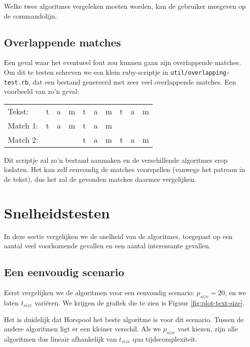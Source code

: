 \documentclass[a4paper,11pt]{article}
\begin{document}
Welke twee algoritmes vergeleken moeten worden, kan de gebruiker meegeven op de
commandolijn.

\subsection{Overlappende matches}

Een geval waar het eventueel fout zou kunnen gaan zijn overlappende matches. Om
dit te testen schreven we een klein ruby-scriptje in
\verb#util/overlapping-test.rb#, dat een bestand genereerd met zeer veel
overlappende matches. Een voorbeeld van zo'n geval:

\begin{center}
\begin{tabular}{llllllllll}
Tekst:   & t & a & m & t & a & m & t & a & m \\
Match 1: & t & a & m & t & a & m &   &   &   \\
Match 2: &   &   &   & t & a & m & t & a & m \\
\end{tabular}
\end{center}

Dit scriptje zal zo'n bestand aanmaken en de verschillende algoritmes erop
loslaten. Het kan zelf eenvoudig de matches voorspellen (vanwege het patroon in
de tekst), dus het zal de gevonden matches daarmee vergelijken.

\section{Snelheidstesten}

In deze sectie vergelijken we de snelheid van de algoritmes, toegepast op een
aantal veel voorkomende gevallen en een aantal interessante gevallen.

\subsection{Een eenvoudig scenario}

Eerst vergelijken we de algoritmen voor een eenvoudig scenario: $p_{size} = 20$,
en we laten $t_{size}$ vari\"eren. We krijgen de grafiek die te zien is Figuur
\ref{fig:plot-text-size}.

Het is duidelijk dat Horspool het beste algoritme is voor dit scenario.
Tussen de andere algoritmen ligt er een kleiner verschil. Als we $p_{size}$
vast kiezen, zijn alle algoritmen dus lineair afhankelijk van $t_{size}$ qua
tijdscomplexiteit.
\end{document}
